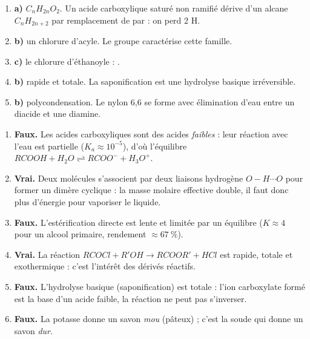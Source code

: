 \documentclass[11pt]{article}
\begin{document}
\begin{corrige}
\begin{enumerate}
\item \textbf{a)} $C_nH_{2n}O_2$. Un acide carboxylique saturé non ramifié dérive d'un alcane $C_nH_{2n+2}$ par remplacement de  par  : on perd 2 H.
\item \textbf{b)} un chlorure d'acyle. Le groupe  caractérise cette famille.
\item \textbf{c)} le chlorure d'éthanoyle : .
\item \textbf{b)} rapide et totale. La saponification est une hydrolyse basique irréversible.
\item \textbf{b)} polycondensation. Le nylon 6,6 se forme avec élimination d'eau entre un diacide et une diamine.
\end{enumerate}
\end{corrige}

\begin{corrige}
\begin{enumerate}
\item \textbf{Faux.} Les acides carboxyliques sont des acides \emph{faibles} : leur réaction avec l'eau est partielle ($K_a \approx 10^{-5}$), d'où l'équilibre $RCOOH + H_2O \rightleftharpoons RCOO^- + H_3O^+$.
\item \textbf{Vrai.} Deux molécules s'associent par deux liaisons hydrogène $O-H\cdots O$ pour former un dimère cyclique : la masse molaire effective double, il faut donc plus d'énergie pour vaporiser le liquide.
\item \textbf{Faux.} L'estérification directe est lente et limitée par un équilibre ($K \approx 4$ pour un alcool primaire, rendement $\approx \SI{67}{\%}$).
\item \textbf{Vrai.} La réaction $RCOCl + R'OH \rightarrow RCOOR' + HCl$ est rapide, totale et exothermique : c'est l'intérêt des dérivés réactifs.
\item \textbf{Faux.} L'hydrolyse basique (saponification) est totale : l'ion carboxylate formé est la base d'un acide faible, la réaction ne peut pas s'inverser.
\item \textbf{Faux.} La potasse  donne un savon \emph{mou} (pâteux) ; c'est la soude  qui donne un savon \emph{dur}.
\end{enumerate}
\end{corrige}
\end{document}
